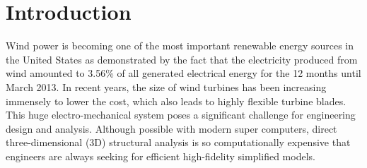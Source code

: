 \documentclass{aiaa-tc}
\begin{document}
\section{Introduction} 

Wind power is becoming one of the most important renewable energy sources in
the United States as demonstrated by the fact that the electricity produced
from wind amounted to 3.56\% of all generated electrical energy for the 12
months until March 2013\cite{WindWiki}. In recent years, the size of wind
turbines has been increasing immensely to lower the cost, which also leads
to highly flexible turbine blades. This huge electro-mechanical system poses
a significant challenge for engineering design and analysis. Although
possible with modern super computers, direct three-dimensional (3D)
structural analysis is so computationally expensive that engineers are
always seeking for efficient high-fidelity simplified models.
\end{document}
